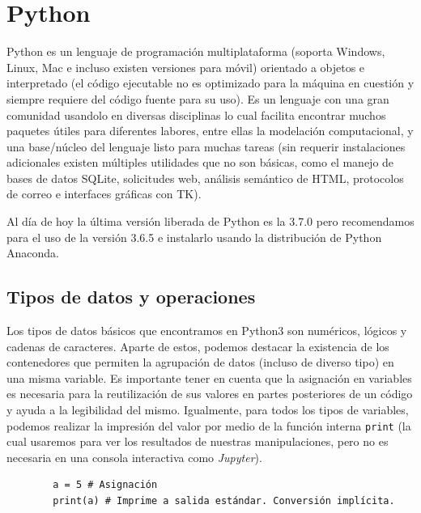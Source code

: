 \section{Python}

Python es un lenguaje de programación multiplataforma (soporta Windows,
Linux, Mac e incluso existen versiones para móvil) orientado a objetos e
interpretado (el código ejecutable no es optimizado para la máquina en
cuestión y siempre requiere del código fuente para su uso). Es un
lenguaje con una gran comunidad usandolo en diversas disciplinas lo cual
facilita encontrar muchos paquetes útiles para diferentes labores, entre
ellas la modelación computacional, y una base/núcleo del lenguaje listo
para muchas tareas (sin requerir instalaciones adicionales existen
múltiples utilidades que no son básicas, como el manejo de bases de
datos SQLite, solicitudes web, análisis semántico de HTML, protocolos de
correo e interfaces gráficas con TK).

Al día de hoy la última versión liberada de Python es la 3.7.0 pero
recomendamos para el uso de la versión 3.6.5 e instalarlo usando la
distribución de Python Anaconda.

\subsection{Tipos de datos y operaciones}

Los tipos de datos básicos que encontramos en Python3 son numéricos,
lógicos y cadenas de caracteres. Aparte de estos, podemos destacar la
existencia de los contenedores que permiten la agrupación de datos
(incluso de diverso tipo) en una misma variable. Es importante tener en
cuenta que la asignación en variables es necesaria para la reutilización
de sus valores en partes posteriores de un código y ayuda a la
legibilidad del mismo. Igualmente, para todos los tipos de variables,
podemos realizar la impresión del valor por medio de la función interna
\texttt{print} (la cual usaremos para ver los resultados de nuestras
manipulaciones, pero no es necesaria en una consola interactiva como
\emph{Jupyter}).

\begin{listing}[H]
    \begin{verbatim}
        a = 5 # Asignación
        print(a) # Imprime a salida estándar. Conversión implícita.
    \end{verbatim}
\end{listing}


